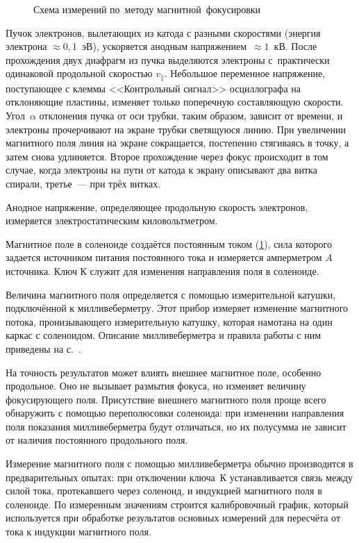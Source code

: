 \begin{figure}
\caption{ Схема измерений по~методу магнитной~фокусировки}
\label{fig3.1.1}
\end{figure}

Пучок электронов, вылетающих из катода с разными скоростями (энергия электрона $\approx 0,1$~эВ), ускоряется анодным напряжением~$\approx 1$~кВ. После прохождения двух диафрагм из пучка выделяются электроны с~практически одинаковой
продольной скоростью $v_{\parallel}$. Небольшое переменное напряжение, поступающее с клеммы <<Контрольный сигнал>>
осциллографа на отклоняющие пластины, изменяет  только поперечную составляющую скорости. Угол~$\alpha$ отклонения пучка от оси трубки, таким образом, зависит  от времени, и электроны прочерчивают на экране трубки светящуюся линию. При увеличении магнитного поля линия на экране сокращается, постепенно стягиваясь в точку, а затем снова удлиняется. Второе прохождение через фокус происходит в том случае, когда электроны на пути от катода к экрану описывают два витка спирали, третье~--- при трёх витках.

Анодное напряжение, определяющее продольную скорость электронов, измеряется электростатическим киловольтметром.

Магнитное поле в соленоиде создаётся постоянным током (\ref{fig3.1.1}), сила которого задается источником питания постоянного тока и измеряется амперметром $A$ источника. Ключ К служит для изменения направления поля в соленоиде.

Величина магнитного поля определяется с помощью измерительной катушки, подключённой к милливеберметру. Этот прибор
измеряет изменение магнитного потока, пронизывающего измерительную катушку, которая намотана  на один каркас с
соленоидом. Описание милливеберметра и правила работы с ним приведены на с.~\pageref{MWB}.

На точность результатов может влиять внешнее магнитное поле, особенно продольное. Оно не вызывает размытия фокуса, но изменяет величину фокусирующего поля. Присутствие внешнего магнитного поля проще всего обнаружить с помощью
переполюсовки соленоида: при изменении направления поля показания милливеберметра будут отличаться, но их полусумма не зависит от наличия постоянного продольного поля.

Измерение магнитного поля с помощью милливеберметра обычно производится в предварительных опытах: при отключении ключа~К устанавливается связь между силой тока, протекавшего через соленоид, и индукцией магнитного поля в соленоиде. По измеренным значениям строится калибровочный график, который используется при обработке результатов основных измерений для пересчёта от тока к индукции магнитного поля.

